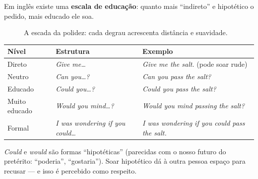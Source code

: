 \documentclass[12pt,a4paper,oneside]{book}
\newcommand{\en}[1]{\textit{#1}}                 %
\begin{document}
Em inglês existe uma \textbf{escala de educação}: quanto mais ``indireto'' e hipotético o pedido, mais educado ele soa.

\begin{figure}[H]
\centering
{}
\caption{A escada da polidez: cada degrau acrescenta distância e suavidade.}
\end{figure}

\begin{center}
\begin{tabularx}{\textwidth}{@{}llX@{}}
\toprule
\textbf{Nível} & \textbf{Estrutura} & \textbf{Exemplo} \\
\midrule
Direto & \en{Give me\ldots} & \en{Give me the salt.} (pode soar rude) \\
Neutro & \en{Can you\ldots?} & \en{Can you pass the salt?} \\
Educado & \en{Could you\ldots?} & \en{Could you pass the salt?} \\
Muito educado & \en{Would you mind\ldots?} & \en{Would you mind passing the salt?} \\
Formal & \en{I was wondering if you could\ldots} & \en{I was wondering if you could pass the salt.} \\
\bottomrule
\end{tabularx}
\end{center}

\begin{nota}
\en{Could} e \en{would} são formas ``hipotéticas'' (parecidas com o nosso futuro do pretérito: ``poderia'', ``gostaria''). Soar hipotético dá à outra pessoa espaço para recusar --- e isso é percebido como respeito.
\end{nota}
\end{document}
